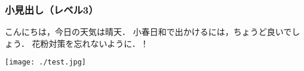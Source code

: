 \documentclass{ltjsbook}
\begin{document}
\subsubsection{小見出し（レベル3）}%
\begin{minipage}[c]{\dimexpr\linewidth-75mm-\leftskip} %
  \lipsum[2]
  こんにちは，今日の天気は晴天．
  小春日和で出かけるには，ちょうど良いでしょう．
  花粉対策を忘れないように．！
  \vfill%
\end{minipage}%
\hspace{5mm}%
\begin{minipage}[b]{70mm} %
  \texttt{[image: ./test.jpg]}%
  \vspace{1em}%
\end{minipage}%
\end{document}
